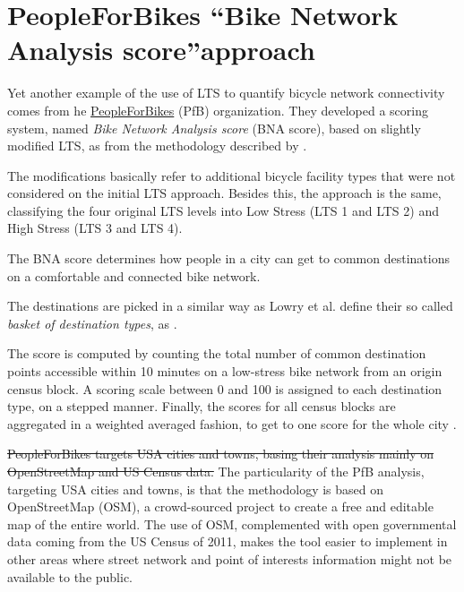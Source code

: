 \documentclass[information,article,submit,moreauthors,Latex,dvi2pdf,10pt,a4paper]{Definitions/mdpi}
\begin{document}
\section{PeopleForBikes \textquotedblleft Bike Network Analysis score\textquotedblright approach} \label{pfb}

\begin{mycolorbox}[colback=yellow]
Yet another example of the use of LTS to quantify bicycle network connectivity comes from he \href{https://peopleforbikes.org/}{PeopleForBikes} (PfB) organization. They developed a scoring system, named \textit{Bike Network Analysis score} (BNA score), based on slightly modified LTS, as from the methodology described by \cite{Mekuria2012b}.
\end{mycolorbox}
\begin{mycolorbox}[colback=cyan]
The modifications basically refer to additional bicycle facility types that were not considered on the initial LTS approach. Besides this, the approach is the same, classifying the four original LTS levels into Low Stress (LTS 1 and LTS 2) and High Stress (LTS 3 and LTS 4).
\end{mycolorbox}
The BNA score determines how people in a city can get to common destinations on a comfortable and connected bike network.
\begin{mycolorbox}[colback=yellow]
The destinations are picked in a similar way as Lowry et al. define their so called \textit{basket of destination types}, as  \cite[p.130]{Lowry2016}.
\end{mycolorbox}
The score is computed by counting the total number of common destination points accessible within 10 minutes on a low-stress bike network from an origin census block. A scoring scale between 0 and 100 is assigned to each destination type, on a stepped manner. Finally, the scores for all census blocks are aggregated in a weighted averaged fashion, to get to one score for the whole city \cite{PeopleforBikes2014}.

\begin{mycolorbox}[colback=yellow]
\sout{PeopleForBikes targets USA cities and towns, basing their analysis mainly on OpenStreetMap and US Census data.} The particularity of the PfB analysis, targeting USA cities and towns, is that the methodology is based on OpenStreetMap (OSM), a crowd-sourced project to create a free and editable map of the entire world. The use of OSM, complemented with open governmental data coming from the US Census of 2011, makes the tool easier to implement in other areas where street network and point of interests information might not be available to the public.
\end{mycolorbox}
\end{document}
